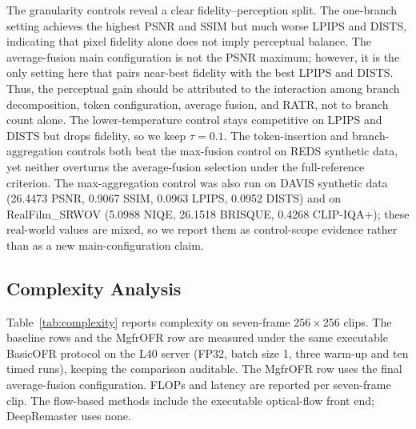 The granularity controls reveal a clear fidelity--perception split. The one-branch setting achieves the highest PSNR and SSIM but much worse LPIPS and DISTS, indicating that pixel fidelity alone does not imply perceptual balance. The average-fusion main configuration is not the PSNR maximum; however, it is the only setting here that pairs near-best fidelity with the best LPIPS and DISTS. Thus, the perceptual gain should be attributed to the interaction among branch decomposition, token configuration, average fusion, and RATR, not to branch count alone. The lower-temperature control stays competitive on LPIPS and DISTS but drops fidelity, so we keep $\tau=0.1$. The token-insertion and branch-aggregation controls both beat the max-fusion control on REDS synthetic data, yet neither overturns the average-fusion selection under the full-reference criterion. The max-aggregation control was also run on DAVIS synthetic data (26.4473 PSNR, 0.9067 SSIM, 0.0963 LPIPS, 0.0952 DISTS) and on RealFilm\_SRWOV (5.0988 NIQE, 26.1518 BRISQUE, 0.4268 CLIP-IQA+); these real-world values are mixed, so we report them as control-scope evidence rather than as a new main-configuration claim.

\FloatBarrier

\subsection{Complexity Analysis}
\label{subsec:complexity}

Table~\ref{tab:complexity} reports complexity on seven-frame $256{\times}256$ clips. The baseline rows and the MgfrOFR row are measured under the same executable BasicOFR protocol on the L40 server (FP32, batch size 1, three warm-up and ten timed runs), keeping the comparison auditable. The MgfrOFR row uses the final average-fusion configuration. FLOPs and latency are reported per seven-frame clip. The flow-based methods include the executable optical-flow front end; DeepRemaster uses none.

